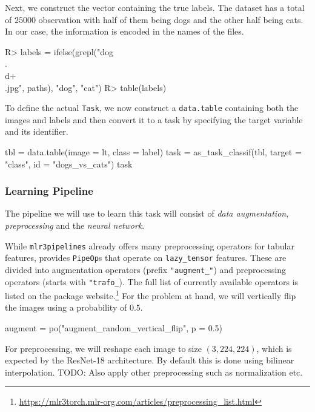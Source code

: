 \documentclass[article, nojss]{jss}
\theoremstyle{definition}
\begin{document}
Next, we construct the vector containing the true labels.
The dataset has a total of $25000$ observation with half of them being dogs and the other half being cats.
In our case, the information is encoded in the names of the files.

\begin{CodeInput}
R> labels = ifelse(grepl("dog\\.\\d+\\.jpg", paths), "dog", "cat")
R> table(labels)
\end{CodeInput}

To define the actual \texttt{Task}, we now construct a \texttt{data.table} \citep{dowle2019package} containing both the images and labels and then convert it to a task by specifying the target variable and its identifier.

\begin{CodeInput}
tbl = data.table(image = lt, class = label)
task = as_task_classif(tbl, target = "class", id = "dogs_vs_cats")
task
\end{CodeInput}

\subsubsection{Learning Pipeline}

The pipeline we will use to learn this task will consist of \emph{data augmentation}, \emph{preprocessing} and the \emph{neural network}.

While \texttt{mlr3pipelines} already offers many preprocessing operators for tabular features,  provides \texttt{PipeOp}s that operate on \texttt{lazy\_tensor} features.
These are divided into augmentation operators (prefix \texttt{"augment\_"}) and preprocessing operators (starts with \texttt{"trafo\_}). 
The full list of currently available operators is listed on the package website.\footnote{\url{https://mlr3torch.mlr-org.com/articles/preprocessing\_list.html}}
For the problem at hand, we will vertically flip the images using a probability of $0.5$.

\begin{CodeInput}
augment = po("augment_random_vertical_flip", p = 0.5)
\end{CodeInput}

For preprocessing, we will reshape each image to size $(3, 224, 224)$, which is expected by the ResNet-18 architecture.
By default this is done using bilinear interpolation.
TODO: Also apply other preprocessing such as normalization etc.
\end{document}
